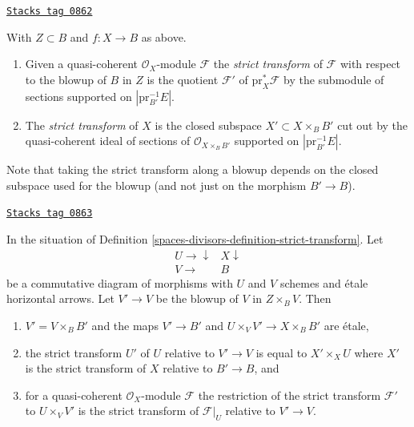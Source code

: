 \begin{definition}
\label{spaces-divisors-definition-strict-transform}
\href{https://stacks.math.columbia.edu/tag/0862}{\texttt{Stacks tag 0862}}

With $Z \subset B$ and $f : X \to B$ as above.
\begin{enumerate}
\item Given a quasi-coherent $\mathcal{O}_X$-module $\mathcal{F}$
the {\it strict transform} of $\mathcal{F}$ with respect to the blowup
of $B$ in $Z$ is the quotient $\mathcal{F}'$ of $\text{pr}_X^*\mathcal{F}$
by the submodule of sections supported on $|\text{pr}_{B'}^{-1}E|$.
\item The {\it strict transform} of $X$ is the closed subspace
$X' \subset X \times_B B'$ cut out by the quasi-coherent ideal of
sections of $\mathcal{O}_{X \times_B B'}$ supported on
$|\text{pr}_{B'}^{-1}E|$.
\end{enumerate}
\end{definition}

Note that taking the strict transform along a blowup depends on the
closed subspace used for the blowup
(and not just on the morphism $B' \to B$).

\begin{lemma}

\label{spaces-divisors-lemma-strict-transform-local}
\href{https://stacks.math.columbia.edu/tag/0863}{\texttt{Stacks tag 0863}}

In the situation of Definition \ref{spaces-divisors-definition-strict-transform}.
Let
$$
\begin{array}{cc}U \longrightarrow\downarrow & X \downarrow \\ V \longrightarrow & B\end{array}
$$
be a commutative diagram of morphisms with $U$ and $V$ schemes and
\'etale horizontal arrows. Let $V' \to V$ be the blowup of $V$
in $Z \times_B V$. Then
\begin{enumerate}
\item $V' = V \times_B B'$ and the maps
$V' \to B'$ and $U \times_V V' \to X \times_B B'$ are \'etale,
\item the strict transform $U'$ of $U$ relative to $V' \to V$
is equal to $X' \times_X U$ where $X'$ is the strict transform of $X$
relative to $B' \to B$, and
\item for a quasi-coherent $\mathcal{O}_X$-module $\mathcal{F}$ the
restriction of the strict transform $\mathcal{F}'$ to
$U \times_V V'$ is the strict transform of $\mathcal{F}|_U$ relative
to $V' \to V$.
\end{enumerate}
\end{lemma}


